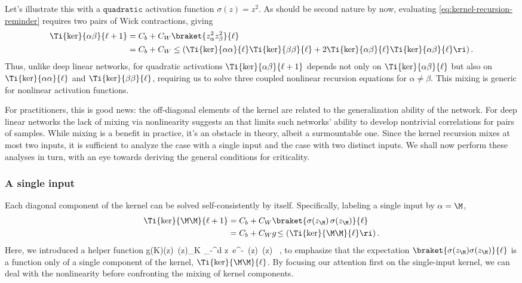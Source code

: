 Let's illustrate this with a $\texttt{quadratic}$ activation function $\sigma(z)=z^2$. 
As should be second nature by now, evaluating \eqref{eq:kernel-recursion-reminder} requires two pairs of Wick contractions, giving
\begin{align}
\Ti{\ker}{\alpha\beta}{\ell+1} &= C_b + C_W \braket{z_{\alpha}^2 z_{\beta}^2}{\ell} \,  \\
&=C_b+C_W \le(\Ti{\ker}{\alpha\alpha}{\ell}\Ti{\ker}{\beta\beta}{\ell}+2\Ti{\ker}{\alpha\beta}{\ell}\Ti{\ker}{\alpha\beta}{\ell}\ri)\, .\nonumber
\end{align}
Thus, unlike deep linear networks, for quadratic activations $\Ti{\ker}{\alpha\beta}{\ell+1}$ depends not only on $\Ti{\ker}{\alpha\beta}{\ell}$ but also on $\Ti{\ker}{\alpha\alpha}{\ell}$ and $\Ti{\ker}{\beta\beta}{\ell}$, requiring us to solve three coupled nonlinear recursion equations for $\alpha\ne\beta$.
This mixing is generic for nonlinear activation functions.

 

For practitioners, this is good news: the off-diagonal elements of the kernel are related to the generalization ability of the network. For deep linear networks the lack of mixing via nonlinearity suggests an  that limits such networks' ability to develop nontrivial correlations for pairs of samples. %
While mixing is a benefit in practice, it's an obstacle in theory, albeit a surmountable one. Since the kernel recursion mixes at most two inputs, it is sufficient to analyze the case with a single input and the case with two distinct inputs. We shall now perform these analyses in turn, with an eye towards deriving the general conditions for criticality.




\subsubsection{A single input}
Each diagonal component of the kernel can be solved self-consistently by itself. Specifically, labeling a single input by $\alpha=\M$,
\begin{align}\label{eq:kernel-diagonal}
\Ti{\ker}{\M\M}{\ell+1}& = C_b + C_W\braket{\sigma(z_{\M})\,\sigma(z_{\M})}{\ell} \,  \\
&=C_b + C_W g\!\le(\Ti{\ker}{\M\M}{\ell}\ri) \, . \nonumber
\end{align}
Here, we introduced a helper function
\be\label{eq:helper_first}
g\!\le(K\ri)\equiv \le\langle \sigma(z)\, \sigma(z)\ri\rangle_{K} \equiv {} \int_{-\infty}^{\infty}d z\  e^{-}\, \sigma(z)\, \sigma(z)  \, ,
\ee
to emphasize that the expectation $\braket{\sigma(z_{\M})\sigma(z_{\M})}{\ell}$ is a function only of a single component of the kernel, $\Ti{\ker}{\M\M}{\ell}$.
By focusing our attention first on the single-input kernel, we can deal with the nonlinearity before confronting the mixing of kernel components.


